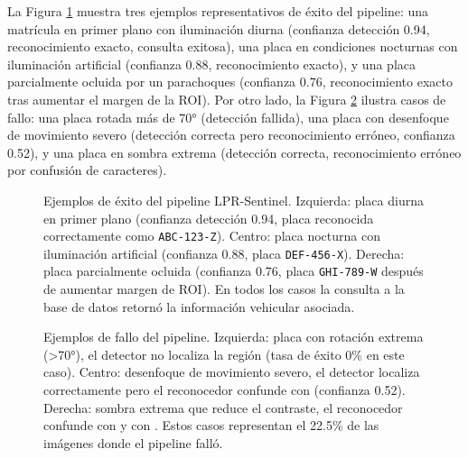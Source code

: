 La Figura \ref{fig:pipeline_success_examples} muestra tres ejemplos representativos de éxito del pipeline: una matrícula en primer plano con iluminación diurna (confianza detección 0.94, reconocimiento exacto, consulta exitosa), una placa en condiciones nocturnas con iluminación artificial (confianza 0.88, reconocimiento exacto), y una placa parcialmente ocluida por un parachoques (confianza 0.76, reconocimiento exacto tras aumentar el margen de la ROI). Por otro lado, la Figura \ref{fig:pipeline_failure_examples} ilustra casos de fallo: una placa rotada más de 70° (detección fallida), una placa con desenfoque de movimiento severo (detección correcta pero reconocimiento erróneo, confianza 0.52), y una placa en sombra extrema (detección correcta, reconocimiento erróneo por confusión de caracteres).

\begin{figure}[h]
\centering
\caption[Ejemplos de éxito del pipeline LPR-Sentinel]{Ejemplos de éxito del pipeline LPR-Sentinel. Izquierda: placa diurna en primer plano (confianza detección 0.94, placa reconocida correctamente como \texttt{ABC-123-Z}). Centro: placa nocturna con iluminación artificial (confianza 0.88, placa \texttt{DEF-456-X}). Derecha: placa parcialmente ocluida (confianza 0.76, placa \texttt{GHI-789-W} después de aumentar margen de ROI). En todos los casos la consulta a la base de datos retornó la información vehicular asociada.}
\label{fig:pipeline_success_examples}
\end{figure}

\begin{figure}[h]
\centering
\caption[Ejemplos de fallo del pipeline LPR-Sentinel]{Ejemplos de fallo del pipeline. Izquierda: placa con rotación extrema (>70°), el detector no localiza la región (tasa de éxito 0\% en este caso). Centro: desenfoque de movimiento severo, el detector localiza correctamente pero el reconocedor confunde  con  (confianza 0.52). Derecha: sombra extrema que reduce el contraste, el reconocedor confunde  con  y  con . Estos casos representan el 22.5\% de las imágenes donde el pipeline falló.}
\label{fig:pipeline_failure_examples}
\end{figure}